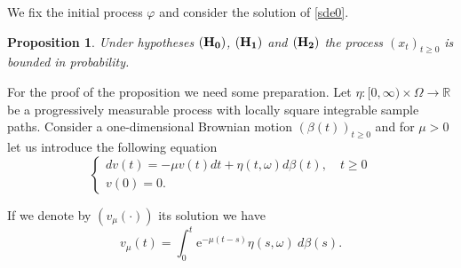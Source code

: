 \documentclass[11pt,reqno,draft]{amsart}
\newtheorem{proposition}[defi]{Proposition}
\begin{document}
\noindent We fix the initial process $\varphi$ and consider the
solution of \eqref{sde0}.
\begin{proposition}\label{Beschr.Masse}
Under hypotheses ${\bf(H_0)}$,  ${\bf(H_1)}$ and  ${\bf(H_2)}$ the process $(x_t)_{t\geq 0}$
is bounded in probability.
\end{proposition}
\noindent For the proof of the proposition we need some preparation.
Let $\eta\colon [0,\infty)\times\Omega\to {\mathbb R}$ be
 a progressively measurable process with locally square integrable sample paths.
Consider a one-dimensional Brownian motion $(\beta (t) )_{t\ge 0}$ and for $\mu>0$ let us
introduce the following equation
\begin{equation*}
 \left\{
\begin{array}{ll}
dv(t)=-\mu v(t)dt+\eta(t,\omega)d\beta(t),\quad
t\geq0\\
v(0)=0.
\end{array}
\right.
\end{equation*}

\noindent If we denote by $(v_{\mu}(\cdot))$ its solution we have
$$
v_{\mu}(t)=\int_0^t{\mathrm{e}}^{-\mu(t-s)}\eta(s,\omega)\:d\beta(s).
$$
\end{document}
